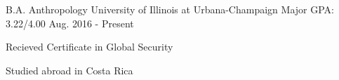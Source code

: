 

\begin{cventries}

  \cventry
    {B.A. Anthropology} %
    {University of Illinois at Urbana-Champaign} %
    {Major GPA: 3.22/4{\tiny{.00}}} %
    {Aug. 2016 - Present} %
    {
      \begin{cvitems} %
        \item {Recieved Certificate in Global Security}
        \item {Studied abroad in Costa Rica}
      \end{cvitems}
    }

\end{cventries}
